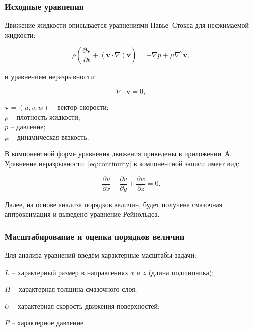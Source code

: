\subsubsection*{Исходные уравнения}

Движение жидкости описывается уравнениями Навье--Стокса для несжимаемой жидкости:

\begin{equation}
\rho\left(\frac{\partial \mathbf{v}}{\partial t} + (\mathbf{v} \cdot \nabla)\mathbf{v}\right) = -\nabla p + \mu \nabla^2 \mathbf{v},
\label{eq:navier_stokes}
\end{equation}

и уравнением неразрывности:

\begin{equation}
\nabla \cdot \mathbf{v} = 0,
\label{eq:continuity}
\end{equation}
\begin{conditions}
$\mathbf{v} = (u, v, w)$ -- вектор скорости;\\
$\rho$ -- плотность жидкости;\\
$p$ -- давление;\\
$\mu$ -- динамическая вязкость.
\end{conditions}
В компонентной форме уравнения движения приведены в приложении~А. Уравнение неразрывности~\eqref{eq:continuity} в компонентной записи имеет вид:

\begin{equation}
\frac{\partial u}{\partial x} + \frac{\partial v}{\partial y} + \frac{\partial w}{\partial z} = 0.
\label{eq:continuity_comp}
\end{equation}

Далее, на основе анализа порядков величин, будет получена смазочная аппроксимация и выведено уравнение Рейнольдса.

\subsubsection*{Масштабирование и оценка порядков величин}

Для анализа уравнений введём характерные масштабы задачи:

$L$ -- характерный размер в направлениях $x$ и $z$ (длина подшипника);

$H$ -- характерная толщина смазочного слоя;

$U$ -- характерная скорость движения поверхностей;

$P$ -- характерное давление.

